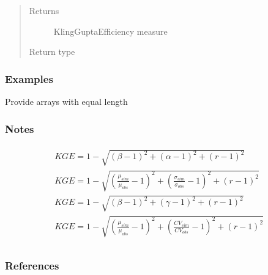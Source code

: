 \documentclass[letterpaper,10pt,english]{sphinxmanual}
\begin{document}
\begin{fulllineitems}
\begin{quote}
\begin{description}
\begin{itemize}
\end{itemize}

\item[{Returns}] \leavevmode
{} \textendash{} Kling\sphinxhyphen{}Gupta\sphinxhyphen{}Efficiency measure

\item[{Return type}] \leavevmode
{}

\end{description}\end{quote}
\subsubsection*{Examples}

Provide arrays with equal length

\begin{sphinxVerbatim}[commandchars=\\\{\}]
   
   
  \PYG{p}{[}     \PYG{p}{]}
  \PYG{p}{[}     \PYG{p}{]}
 
\end{sphinxVerbatim}
\subsubsection*{Notes}
\begin{align*}\!\begin{aligned}
KGE = 1 - \sqrt{(\beta - 1)^2 + (\alpha - 1)^2 + (r - 1)^2}\\
KGE = 1 - \sqrt{(\frac{\mu_{sim}}{\mu_{obs}} - 1)^2 + (\frac{\sigma_{sim}}{\sigma_{obs}} - 1)^2 + (r - 1)^2}\\
KGE = 1 - \sqrt{(\beta - 1)^2 + (\gamma - 1)^2 + (r - 1)^2}\\
KGE = 1 - \sqrt{(\frac{\mu_{sim}}{\mu_{obs}} - 1)^2 + (\frac{CV_{sim}}{CV_{obs}} - 1)^2 + (r - 1)^2}\\
\end{aligned}\end{align*}\subsubsection*{References}


\end{fulllineitems}
\end{document}
